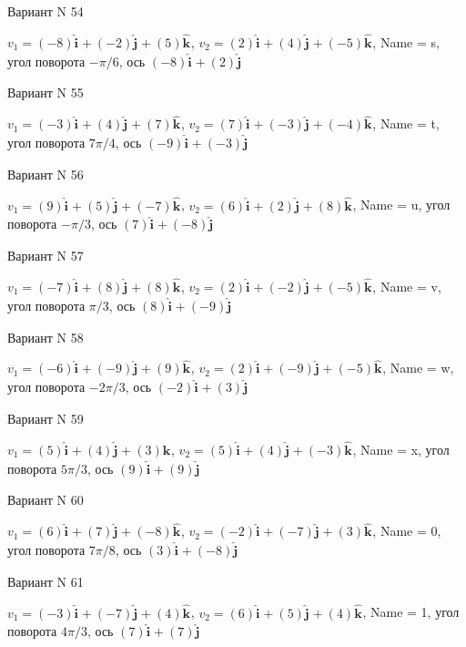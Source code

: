 \documentclass[11pt]{report}
\begin{document}
Вариант N 54

$v_1 = (-8)\mathbf{\hat{i}_{}} + (-2)\mathbf{\hat{j}_{}} + (5)\mathbf{\hat{k}_{}}$, $v_2 = (2)\mathbf{\hat{i}_{}} + (4)\mathbf{\hat{j}_{}} + (-5)\mathbf{\hat{k}_{}}$, Name = s, угол поворота $- \pi / 6$, ось $(-8)\mathbf{\hat{i}_{}} + (2)\mathbf{\hat{j}_{}}$

Вариант N 55

$v_1 = (-3)\mathbf{\hat{i}_{}} + (4)\mathbf{\hat{j}_{}} + (7)\mathbf{\hat{k}_{}}$, $v_2 = (7)\mathbf{\hat{i}_{}} + (-3)\mathbf{\hat{j}_{}} + (-4)\mathbf{\hat{k}_{}}$, Name = t, угол поворота $7 \pi / 4$, ось $(-9)\mathbf{\hat{i}_{}} + (-3)\mathbf{\hat{j}_{}}$

Вариант N 56

$v_1 = (9)\mathbf{\hat{i}_{}} + (5)\mathbf{\hat{j}_{}} + (-7)\mathbf{\hat{k}_{}}$, $v_2 = (6)\mathbf{\hat{i}_{}} + (2)\mathbf{\hat{j}_{}} + (8)\mathbf{\hat{k}_{}}$, Name = u, угол поворота $- \pi / 3$, ось $(7)\mathbf{\hat{i}_{}} + (-8)\mathbf{\hat{j}_{}}$

Вариант N 57

$v_1 = (-7)\mathbf{\hat{i}_{}} + (8)\mathbf{\hat{j}_{}} + (8)\mathbf{\hat{k}_{}}$, $v_2 = (2)\mathbf{\hat{i}_{}} + (-2)\mathbf{\hat{j}_{}} + (-5)\mathbf{\hat{k}_{}}$, Name = v, угол поворота $\pi / 3$, ось $(8)\mathbf{\hat{i}_{}} + (-9)\mathbf{\hat{j}_{}}$

Вариант N 58

$v_1 = (-6)\mathbf{\hat{i}_{}} + (-9)\mathbf{\hat{j}_{}} + (9)\mathbf{\hat{k}_{}}$, $v_2 = (2)\mathbf{\hat{i}_{}} + (-9)\mathbf{\hat{j}_{}} + (-5)\mathbf{\hat{k}_{}}$, Name = w, угол поворота $- 2 \pi / 3$, ось $(-2)\mathbf{\hat{i}_{}} + (3)\mathbf{\hat{j}_{}}$

Вариант N 59

$v_1 = (5)\mathbf{\hat{i}_{}} + (4)\mathbf{\hat{j}_{}} + (3)\mathbf{\hat{k}_{}}$, $v_2 = (5)\mathbf{\hat{i}_{}} + (4)\mathbf{\hat{j}_{}} + (-3)\mathbf{\hat{k}_{}}$, Name = x, угол поворота $5 \pi / 3$, ось $(9)\mathbf{\hat{i}_{}} + (9)\mathbf{\hat{j}_{}}$

Вариант N 60

$v_1 = (6)\mathbf{\hat{i}_{}} + (7)\mathbf{\hat{j}_{}} + (-8)\mathbf{\hat{k}_{}}$, $v_2 = (-2)\mathbf{\hat{i}_{}} + (-7)\mathbf{\hat{j}_{}} + (3)\mathbf{\hat{k}_{}}$, Name = 0, угол поворота $7 \pi / 8$, ось $(3)\mathbf{\hat{i}_{}} + (-8)\mathbf{\hat{j}_{}}$

Вариант N 61

$v_1 = (-3)\mathbf{\hat{i}_{}} + (-7)\mathbf{\hat{j}_{}} + (4)\mathbf{\hat{k}_{}}$, $v_2 = (6)\mathbf{\hat{i}_{}} + (5)\mathbf{\hat{j}_{}} + (4)\mathbf{\hat{k}_{}}$, Name = 1, угол поворота $4 \pi / 3$, ось $(7)\mathbf{\hat{i}_{}} + (7)\mathbf{\hat{j}_{}}$
\end{document}
